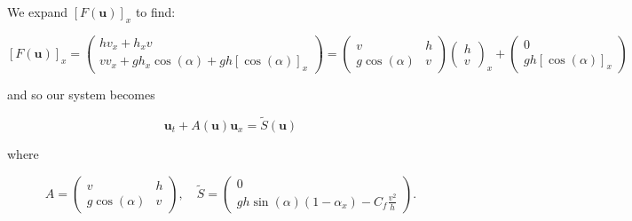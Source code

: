 We expand $[F(\textbf{u})]_x$ to find:

$$
[F(\textbf{u})]_x = \begin{pmatrix}
    h v_x + h_x v \\
    v v_x + g h_x \cos{(\alpha)} + g h [\cos{(\alpha)}]_x
\end{pmatrix} = \begin{pmatrix}
    v                & h \\
    g \cos{(\alpha)} & v
\end{pmatrix} \begin{pmatrix}
    h \\
    v
\end{pmatrix}_x + \begin{pmatrix}
    0 \\
    g h [\cos{(\alpha)}]_x
\end{pmatrix}
$$

and so our system becomes

$$
\textbf{u}_t + A(\textbf{u}) \textbf{u}_x = \tilde{S}(\textbf{u})
$$

where 

$$
A = \begin{pmatrix}
    v                & h \\
    g \cos{(\alpha)} & v
\end{pmatrix}, \quad \tilde{S} = \begin{pmatrix}
    0 \\
    g h \sin{(\alpha)} (1 - \alpha_x) - C_f \frac{v^2}{h}
\end{pmatrix}.
$$
